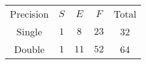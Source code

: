 \bgroup{}
\begin{tabular}{ccccc} \hline
  Precision & $S$ & $E$ & $F$ & Total \\ \hhline{=====}
  Single & $1$ & $8$ & $23$ & 32
  \\ \hline
  Double & $1$ & $11$ & $52$ & 64
  \\ \hline
\end{tabular}
\egroup
